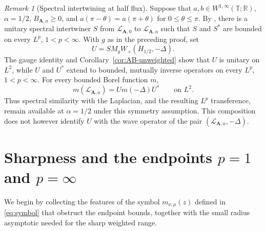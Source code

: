 \documentclass[11pt,a4paper,reqno,backref=page]{amsart}
\newcommand{\R}{\mathbb R}
\newcommand{\T}{\mathbb T}
\numberwithin{equation}{section}
\theoremstyle{definition}
\theoremstyle{remark}
\newtheorem{remark}[theorem]{Remark}
\begin{document}
\begin{remark}[Spectral intertwining at half flux]
\label{rem:half-flux-intertwining}
  Suppose that $a,b\in W^{1,\infty}(\T;\R)$, $\alpha=1/2$,
  $B_{\mathbf A,a}\ge0$, and
  $a(\pi-\theta)=a(\pi+\theta)$ for $0\le\theta\le\pi$.
  By \cite[Theorem~2.13]{FSWZZ2026}, there is a unitary
  spectral intertwiner $S$ from $\mathcal L_{\mathbf A,0}$
  to $\mathcal L_{\mathbf A,a}$ such that $S$ and $S^*$
  are bounded on every $L^p$, $1<p<\infty$.
  With $g$ as in the preceding proof, set
  \begin{equation*}
    U=S M_g W_+(H_{1/2},-\Delta).
  \end{equation*}
  The gauge identity and Corollary~\ref{cor:AB-unweighted}
  show that $U$ is unitary on $L^2$, while $U$ and $U^*$
  extend to bounded, mutually inverse operators on every
  $L^p$, $1<p<\infty$. For every bounded Borel function $m$,
  \begin{equation*}
    m(\mathcal L_{\mathbf A,a})
    =U m(-\Delta)U^*\qquad\text{on }L^2.
  \end{equation*}
  Thus spectral similarity with the Laplacian, and the
  resulting $L^p$ transference, remain available at $\alpha=1/2$
  under this symmetry assumption. This composition
  does not however identify $U$ with the wave operator
  of the pair $(\mathcal L_{\mathbf A,a},-\Delta)$.
\end{remark}


\section{Sharpness and the endpoints
\texorpdfstring{$p=1$ and $p=\infty$}{p=1 and p=infty}}
\label{sec:endpoints}

We begin by collecting the features of the symbol 
$m_{\nu,\mu}(z)$ defined in \eqref{eq:symbol} that obstruct
the endpoint bounds, together with the small radius asymptotic
needed for the sharp weighted range.
\end{document}
